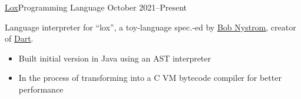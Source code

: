 \documentclass[10pt,a4paper,ragged2e,withhyper]{altacv}
\begin{document}
\begin{paracol}{2}
		\cvevent
		{\href{https://github.com/jaacko-torus/lox}{\uline{Lox}}{\hr}Programming Language}
		{{\CVTagJava}{\CVTagC}}
		{October 2021--Present}{}
		\vspace{-0.3cm}
		\begin{justify}
			Language interpreter for ``lox'', a toy-language spec.-ed by \href{https://github.com/munificent}{\uline{Bob Nystrom}}, creator of \href{https://en.wikipedia.org/wiki/Dart_(programming_language)}{\uline{Dart}}.
		\end{justify}
		\vspace{-0.2cm}
		\smallskip
		\begin{itemize}
			\item Built initial version in Java using an AST interpreter
			\item In the process of transforming into a C VM bytecode compiler for better performance
		\end{itemize}


	\end{paracol}
\end{document}
